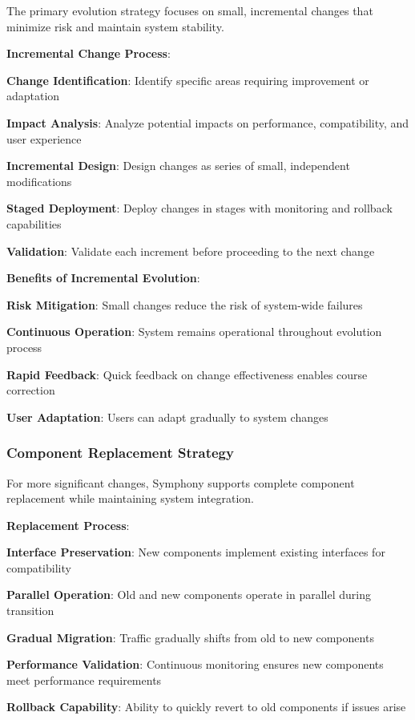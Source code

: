 The primary evolution strategy focuses on small, incremental changes that minimize risk and maintain system stability.

\textbf{Incremental Change Process}:
\begin{expandedlist}
    \item \textbf{Change Identification}: Identify specific areas requiring improvement or adaptation
    \item \textbf{Impact Analysis}: Analyze potential impacts on performance, compatibility, and user experience
    \item \textbf{Incremental Design}: Design changes as series of small, independent modifications
    \item \textbf{Staged Deployment}: Deploy changes in stages with monitoring and rollback capabilities
    \item \textbf{Validation}: Validate each increment before proceeding to the next change
\end{expandedlist}

\textbf{Benefits of Incremental Evolution}:
\begin{compactlist}
    \item \textbf{Risk Mitigation}: Small changes reduce the risk of system-wide failures
    \item \textbf{Continuous Operation}: System remains operational throughout evolution process
    \item \textbf{Rapid Feedback}: Quick feedback on change effectiveness enables course correction
    \item \textbf{User Adaptation}: Users can adapt gradually to system changes
\end{compactlist}

\subsubsection*{Component Replacement Strategy}

For more significant changes, Symphony supports complete component replacement while maintaining system integration.

\textbf{Replacement Process}:
\begin{expandedlist}
    \item \textbf{Interface Preservation}: New components implement existing interfaces for compatibility
    \item \textbf{Parallel Operation}: Old and new components operate in parallel during transition
    \item \textbf{Gradual Migration}: Traffic gradually shifts from old to new components
    \item \textbf{Performance Validation}: Continuous monitoring ensures new components meet performance requirements
    \item \textbf{Rollback Capability}: Ability to quickly revert to old components if issues arise
\end{expandedlist}

